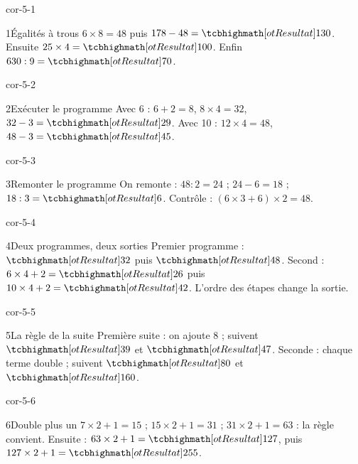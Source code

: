 \clearpage\pagestyle{otMain}\setlength{\otBlocEspacement}{2.5mm}\fontsize{11}{15}\selectfont{}
\begin{blocLivre}{cor-5-1}\begin{corrige}{1}{Égalités à trous}
$6\times8=48$ puis $178-48=\res{130}$. Ensuite $25\times4=\res{100}$. Enfin $630:9=\res{70}$.
\end{corrige}\end{blocLivre}
\begin{blocLivre}{cor-5-2}\begin{corrige}{2}{Exécuter le programme}
Avec 6 : $6+2=8$, $8\times4=32$, $32-3=\res{29}$. Avec 10 : $12\times4=48$, $48-3=\res{45}$.
\label{fig-cor-5-2}
\end{corrige}\end{blocLivre}
\begin{blocLivre}{cor-5-3}\begin{corrige}{3}{Remonter le programme}
On remonte : $48:2=24$ ; $24-6=18$ ; $18:3=\res6$. Contrôle : $(6\times3+6)\times2=48$.
\end{corrige}\end{blocLivre}
\begin{blocLivre}{cor-5-4}\begin{corrige}{4}{Deux programmes, deux sorties}
Premier programme : $\res{32}$ puis $\res{48}$. Second : $6\times4+2=\res{26}$ puis $10\times4+2=\res{42}$. L’ordre des étapes change la sortie.
\end{corrige}\end{blocLivre}
\begin{blocLivre}{cor-5-5}\begin{corrige}{5}{La règle de la suite}
Première suite : on ajoute 8 ; suivent $\res{39}$ et $\res{47}$. Seconde : chaque terme double ; suivent $\res{80}$ et $\res{160}$.
\end{corrige}\end{blocLivre}
\begin{blocLivre}{cor-5-6}\begin{corrige}{6}{Double plus un}
$7\times2+1=15$ ; $15\times2+1=31$ ; $31\times2+1=63$ : la règle convient. Ensuite : $63\times2+1=\res{127}$, puis $127\times2+1=\res{255}$.
\end{corrige}\end{blocLivre}
